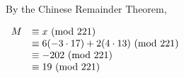 \documentclass[a4paper, 11pt]{article}
\begin{document}
\begin{myEnumerate}
\begin{myEnumerate}
        By the Chinese Remainder Theorem,
        
        \(
        \begin{array}{ll}
        	M & \equiv x $ $ ($mod $ 221) \\
              & \equiv 6(-3 \cdot 17) + 2(4 \cdot 13) $ $ ($mod $ 221) \\
              & \equiv -202 $ $ ($mod $ 221) \\
              & \equiv 19 $ $ ($mod $ 221) \\
        \end{array} \\ \)
        
    \end{myEnumerate}

\end{myEnumerate}
\end{document}

